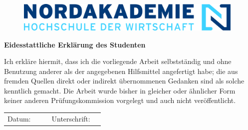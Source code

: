 \thispagestyle{empty}

\setlength{\parindent}{0pt}

\begin{figure}[t]
		\includegraphics[height=1.4cm, right]{asset/frame/header.png}
\end{figure}
\begin{figure}[t]
\end{figure}


\vspace*{\fill}

\large
\textcolor{blue!30!black}{\textbf{Eidesstattliche Erklärung des Studenten }}
\newline

\normalsize
Ich erkläre hiermit, dass ich die vorliegende Arbeit selbstständig und ohne Benutzung anderer als der angegebenen Hilfsmittel angefertigt habe; die aus fremden Quellen direkt oder indirekt übernommenen Gedanken sind als solche kenntlich gemacht. Die Arbeit wurde bisher in gleicher oder ähnlicher Form keiner anderen Prüfungskommission vorgelegt und auch nicht veröffentlicht.
\newline

\begin{tabular}{ p{1.2cm}p{4.5cm}p{2cm}p{2cm}p{4.5cm} }
    Datum: & \dateFinish{} & & Unterschrift: & \\\cline{2-2}\cline{5-5}
\end{tabular}

\vspace*{\fill}